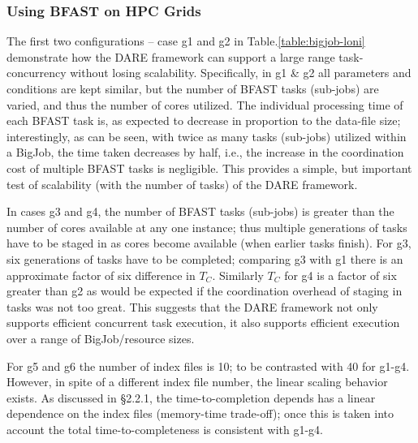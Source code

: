 \documentclass{cpeauth}
\begin{document}
\subsubsection{Using BFAST on HPC Grids}

The first two configurations -- case g1 and g2 in
Table.\ref{table:bigjob-loni} demonstrate how the DARE framework can
support a large range task-concurrency without losing scalability.
Specifically, in g1 \& g2 all parameters and conditions are kept
similar, but the number of BFAST tasks (sub-jobs) are varied, and thus
the number of cores utilized.  The individual processing time of each
BFAST task is, as expected to decrease in proportion to the data-file
size; interestingly, as can be seen, with twice as many tasks
(sub-jobs) utilized within a BigJob, the time taken decreases by half,
i.e., the increase in the coordination cost of multiple BFAST tasks is
negligible. This provides a simple, but important test of scalability
(with the number of tasks) of the DARE framework.  

In cases g3 and g4, the number of BFAST tasks (sub-jobs) is greater
than the number of cores available at any one instance; thus multiple
generations of tasks have to be staged in as cores become available
(when earlier tasks finish).  For g3, six generations of tasks have to
be completed; comparing g3 with g1 there is an approximate factor of
six difference in $T_C$. Similarly $T_C$ for g4 is a factor of six
greater than g2 as would be expected if the coordination overhead of
staging in tasks was not too great. This suggests that the DARE
framework not only supports efficient concurrent task execution, it
also supports efficient execution over a range of BigJob/resource
sizes.

For g5 and g6 the number of index files is 10; to be contrasted with
40 for g1-g4.  However, in spite of a different index file number, the
linear scaling behavior exists.  As discussed in \S 2.2.1, the
time-to-completion depends has a linear dependence on the index files
(memory-time trade-off); once this is taken into account the total
time-to-completeness is consistent with g1-g4.
\end{document}

